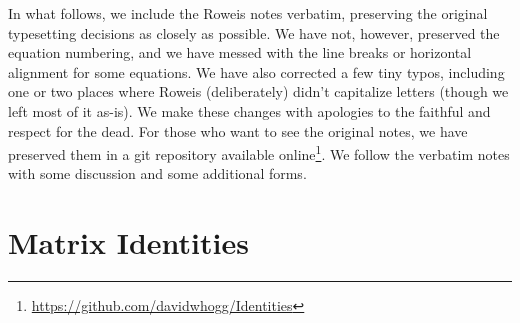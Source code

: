 \documentclass[12pt]{article}
\begin{document}
In what follows, we include the Roweis notes verbatim, preserving
the original typesetting decisions as closely as possible.
We have not, however, preserved the equation numbering,
and we have messed with the line breaks or horizontal alignment for some equations.
We have also corrected a few tiny typos, including one or two places where
Roweis (deliberately) didn't capitalize letters (though we left most of it as-is).
We make these changes with apologies to the faithful and respect for the dead.
For those who want to see the original notes, we have preserved them in a git
repository available online\footnote{\url{https://github.com/davidwhogg/Identities}}.
We follow the verbatim notes with some discussion and some additional forms.

\clearpage
\section{Matrix Identities}


\newcommand{\ie}{\text{i.e.~}}
\newcommand{\eg}{\text{e.g.~}}

\newcommand{\distrib}{\thicksim}
\newcommand{\normal}[2]{\mathcal{N} \left( #1,#2 \right)}
\newcommand{\normale}[3]{\mathcal{N} \left( #1,#2 \right) |_{#3}}
\newcommand{\prob}[1]{P \left( #1 \right)}
\newcommand{\by}{\times}

\newcommand{\sm}[1]{[\begin{smallmatrix}#1\end{smallmatrix}]}
\newcommand{\bm}[1]{\begin{bmatrix}#1\end{bmatrix}}
\newcommand{\xx}{{\mathbf x}}
\newcommand{\yy}{{\mathbf y}}
\newcommand{\zz}{{\mathbf z}}
\newcommand{\mm}{{\mathbf m}}
\renewcommand{\AA}{{\mathbf A}}
\newcommand{\BB}{{\mathbf B}}
\newcommand{\CC}{{\mathbf C}}
\newcommand{\DD}{{\mathbf D}}
\newcommand{\EE}{{\mathbf E}}
\newcommand{\FF}{{\mathbf F}}
\newcommand{\XX}{{\mathbf X}}
\newcommand{\YY}{{\mathbf Y}}
\newcommand{\VV}{{\mathbf V}}
\newcommand{\UU}{{\mathbf U}}
\newcommand{\WW}{{\mathbf W}}
\newcommand{\QQ}{{\mathbf Q}}
\newcommand{\RR}{{\mathbf R}}
\renewcommand{\SS}{{\mathbf S}}
\newcommand{\TT}{{\mathbf T}}
\newcommand{\ZZ}{{\mathbf 0}}
\newcommand{\II}{{\mathbf I}}
\newcommand{\ee}{{\mathbf e}}
\newcommand{\bb}{{\mathbf b}}
\newcommand{\cc}{{\mathbf c}}
\newcommand{\aaa}{{\mathbf a}}
\newcommand{\mmm}{{\boldsymbol \mu}}
\newcommand{\Lm}{{\boldsymbol \Lambda}}
\newcommand{\Sm}{{\boldsymbol \Sigma}}
\newcommand{\Pv}{{\boldsymbol \pi}_1}
\newcommand{\Pm}{{\boldsymbol \Pi}_1}
\newcommand{\trace}[1]{\text{Tr}\left[ #1 \right]}
\newcommand{\rank}[1]{\text{rank}\left[ #1 \right]}
\end{document}
